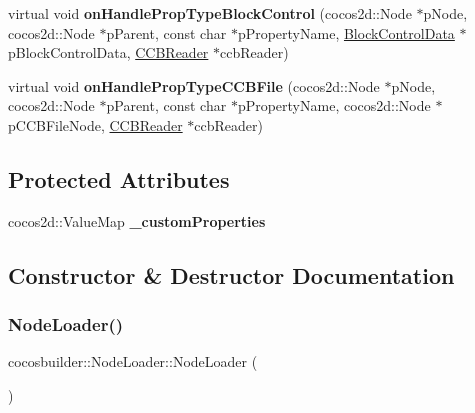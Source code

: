 \begin{DoxyCompactItemize}
virtual void {\bfseries on\+Handle\+Prop\+Type\+Block\+Control} (cocos2d\+::\+Node $\ast$p\+Node, cocos2d\+::\+Node $\ast$p\+Parent, const char $\ast$p\+Property\+Name, \hyperlink{structcocosbuilder_1_1BlockControlData}{Block\+Control\+Data} $\ast$p\+Block\+Control\+Data, \hyperlink{classcocosbuilder_1_1CCBReader}{C\+C\+B\+Reader} $\ast$ccb\+Reader)
\item 
\mbox{\label{classcocosbuilder_1_1NodeLoader_ab8831b58f6be370a37da3106461fce4d}} 
virtual void {\bfseries on\+Handle\+Prop\+Type\+C\+C\+B\+File} (cocos2d\+::\+Node $\ast$p\+Node, cocos2d\+::\+Node $\ast$p\+Parent, const char $\ast$p\+Property\+Name, cocos2d\+::\+Node $\ast$p\+C\+C\+B\+File\+Node, \hyperlink{classcocosbuilder_1_1CCBReader}{C\+C\+B\+Reader} $\ast$ccb\+Reader)
\end{DoxyCompactItemize}
\subsection*{Protected Attributes}
\begin{DoxyCompactItemize}
\item 
\mbox{\label{classcocosbuilder_1_1NodeLoader_aae9762fe21d618e7cbed841625215765}} 
cocos2d\+::\+Value\+Map {\bfseries \+\_\+custom\+Properties}
\end{DoxyCompactItemize}


\subsection{Constructor \& Destructor Documentation}
\mbox{\label{classcocosbuilder_1_1NodeLoader_a8216017687e72740fa113b10c11ff2cb}} 
\subsubsection{\texorpdfstring{Node\+Loader()}{NodeLoader()}\hspace{0.1cm}{\footnotesize\ttfamily [1/2]}}
{\footnotesize\ttfamily cocosbuilder\+::\+Node\+Loader\+::\+Node\+Loader (\begin{DoxyParamCaption}{ }\end{DoxyParamCaption})}

